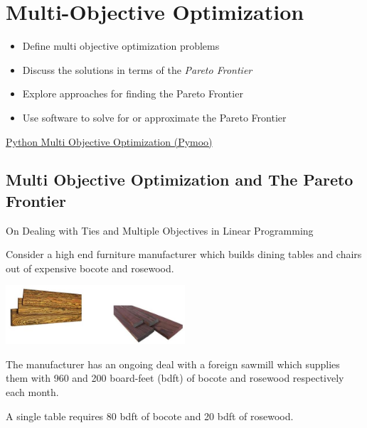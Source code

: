 
\chapter{Multi-Objective Optimization}

\begin{outcome}
\begin{itemize}
\item Define multi objective optimization problems
\item Discuss the solutions in terms of the \emph{Pareto Frontier}
\item Explore approaches for finding the Pareto Frontier
\item Use software to solve for or approximate the Pareto Frontier
\end{itemize}
\end{outcome}

\begin{resource}
\href{https://pymoo.org/}{Python Multi Objective Optimization (Pymoo)}
\end{resource}

\section{Multi Objective Optimization and The Pareto Frontier}
On Dealing with Ties and Multiple Objectives in Linear Programming



Consider a high end furniture manufacturer which builds dining tables and chairs out of expensive bocote and rosewood.

\includegraphics[width=0.5\textwidth]{optimization/multi-objective/images/2022_02_28_634e8079070800ac7e3cg-02}

The manufacturer has an ongoing deal with a foreign sawmill which supplies them with 960 and 200 board-feet (bdft) of bocote and rosewood respectively each month.

A single table requires 80 bdft of bocote and 20 bdft of rosewood.

